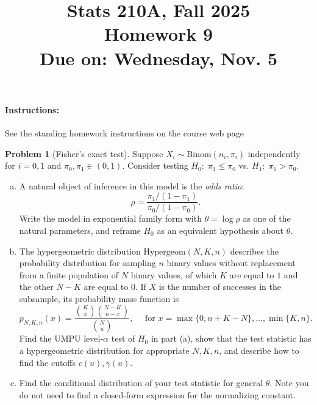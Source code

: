\documentclass{article}
\theoremstyle{definition}
\newtheorem{problem}{Problem}
\begin{document}
\title{Stats 210A, Fall 2025\\
  Homework 9 \\
  {\large {\bf Due on}: Wednesday, Nov. 5}}
\date{}

\maketitle

\paragraph{Instructions:} See the standing homework instructions on the course web page


\begin{problem}[Fisher's exact test]
\label{prob:fisher-exact}
Suppose $X_i \sim \text{Binom}(n_i, \pi_i)$ independently for $i=0,1$ and $\pi_0,\pi_1\in(0,1)$. Consider testing $H_0:\; \pi_1\leq \pi_0$ vs. $H_1:\; \pi_1 > \pi_0$.

\begin{enumerate}[(a)]
\item  A natural object of inference in this model is the {\em odds ratio}:
\[
\rho = \frac{\pi_1/(1-\pi_1)}{\pi_0/(1-\pi_0)}.
\]
Write the model in exponential family form with $\theta=\log\rho$ as one of the natural parameters, and reframe $H_0$ as an equivalent hypothesis about $\theta$.



\item  The hypergeometric distribution $\text{Hypergeom}(N,K,n)$ describes the probability distribution for sampling $n$ binary values without replacement from a finite population of $N$ binary values, of which $K$ are equal to $1$ and the other $N-K$ are equal to $0$. If $X$ is the number of successes in the subsample, its probability mass function is
\[
p_{N,K,n}(x) = \frac{\binom{K}{x}\binom{N-K}{n-x}}{\binom{N}{n}}, \quad \text{ for } x = \max\{0,n+K-N\}, \ldots, \min\{K,n\}.
\]
Find the UMPU level-$\alpha$ test of $H_0$ in part (a), show that the test statistic has a hypergeometric distribution for appropriate $N,K,n$, and describe how to find the cutoffs $c(u), \gamma(u)$.



\item Find the conditional distribution of your test statistic for general $\theta$. Note you do not need to find a closed-form expression for the normalizing constant.




\end{enumerate}
\end{problem}
\end{document}
